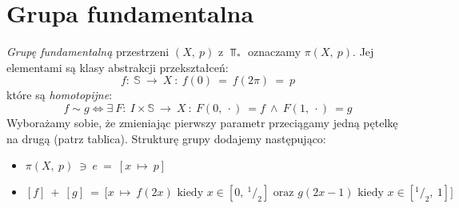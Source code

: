 \section{Grupa fundamentalna}
\emph{Grupę  fundamentalną} przestrzeni $(X,\ p)$ z $\Top_*$ oznaczamy $\pi(X,\ p)$. Jej elementami są klasy abstrakcji przekształceń:
$$f:\ \mathbb{S}\ \to\ X\ :\ f(0)\ =\ f(2\pi)\ =\ p$$
które są \emph{homotopijne}:
$$f \sim g \iff \exists\ F:\ I \times \mathbb{S}\ \to\ X\ :\ F(0,\ \cdot)\ = f\ \wedge\ F(1,\ \cdot)\ = g$$
Wyborażamy sobie, że zmieniając pierwszy parametr przeciągamy jedną pętelkę na drugą (patrz tablica).
Strukturę grupy dodajemy następująco:
\begin{itemize}
	\item $\pi(X,\ p)\ \ni\ e\ =\ [x\ \mapsto\ p]$
	\item $[f]\ +\ [g]\ =\ \bigg[x\ \mapsto\ f(2x)\text{ kiedy }x \in [0,\ ^1/_2]\text{ oraz }g(2x-1)\text{ kiedy }x \in [^1/_2,\ 1]\bigg]$
\end{itemize}